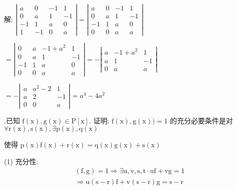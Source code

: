 \documentclass{article}
\begin{document}
解:
$\left|\begin{array}{cccc}a & 0 & -1 & 1 \\ 0 & a & 1 & -1 \\ -1 & 1 & a & 0 \\ 1 & -1 & 0 & a\end{array}\right|=\left|\begin{array}{cccc}a & 0 & -1 & 1 \\ 0 & a & 1 & -1 \\ -1 & 1 & a & 0 \\ 0 & 0 & a & a\end{array}\right|$

$=\left|\begin{array}{cccc}0 & a & -1+a^{2} & 1 \\ 0 & a & 1 & -1 \\ -1 & 1 & a & 0 \\ 0 & 0 & a & a\end{array}\right|=-\left|\begin{array}{ccc}a & -1+a^{2} & 1 \\ a & 1 & -1 \\ 0 & a & a\end{array}\right|$

$=-\left|\begin{array}{ccc}a & a^{2}-2 & 1 \\ a & 2 & -1 \\ 0 & 0 & a\end{array}\right|=a^{4}-4 a^{2}$

\vspace{1ex}
{.}已知 $\mathrm{f}(\mathrm{x}), \mathrm{g}(\mathrm{x}) \in \mathrm{P}[\mathrm{x}] .$ 证明: $\mathrm{f}(\mathrm{x}), \mathrm{g}(\mathrm{x}))=1$ 的充分必要条件是对 $\forall \mathrm{r}(\mathrm{x}), \mathrm{s}(\mathrm{x}), \exists \mathrm{p}(\mathrm{x}), \mathrm{q}(\mathrm{x})$

使得 $\mathrm{p}(\mathrm{x}) \mathrm{f}(\mathrm{x})+\mathrm{r}(\mathrm{x})=\mathrm{q}(\mathrm{x}) \mathrm{g}(\mathrm{x})+\mathrm{s}(\mathrm{x})$

(1) 充分性:
$$
    \begin{array}{r}
        (\mathrm{f}, \mathrm{g})=1 \Rightarrow \exists \mathrm{u}, \mathrm{v}, \mathrm{s}, \mathrm{t} \cdot \mathrm{uf}+\mathrm{vg}=1 \\
        \Rightarrow \mathrm{u}(\mathrm{s}-\mathrm{r}) \mathrm{f}+\mathrm{v}(\mathrm{s}-\mathrm{r}) \mathrm{g}=\mathrm{s}-\mathrm{r}
    \end{array}
$$
\end{document}

